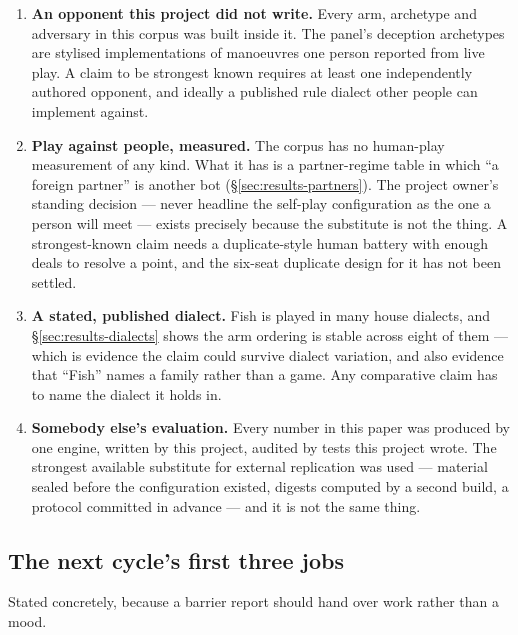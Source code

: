 \begin{enumerate}

\item \textbf{An opponent this project did not write.} Every arm, archetype and adversary in this
  corpus was built inside it. The panel's deception archetypes are stylised implementations of
  manoeuvres one person reported from live play. A claim to be strongest known requires at least one
  independently authored opponent, and ideally a published rule dialect other people can implement
  against.

\item \textbf{Play against people, measured.} The corpus has no human-play measurement of any kind.
  What it has is a partner-regime table in which ``a foreign partner'' is another bot
  (\S\ref{sec:results-partners}). The project owner's standing decision --- never headline the
  self-play configuration as the one a person will meet --- exists precisely because the substitute is
  not the thing. A strongest-known claim needs a duplicate-style human battery with enough deals to
  resolve a point, and the six-seat duplicate design for it has not been settled.

\item \textbf{A stated, published dialect.} Fish is played in many house dialects, and
  \S\ref{sec:results-dialects} shows the arm ordering is stable across eight of them --- which is
  evidence the claim could survive dialect variation, and also evidence that ``Fish'' names a family
  rather than a game. Any comparative claim has to name the dialect it holds in.

\item \textbf{Somebody else's evaluation.} Every number in this paper was produced by one engine,
  written by this project, audited by tests this project wrote. The strongest available substitute for
  external replication was used --- material sealed before the configuration existed, digests computed
  by a second build, a protocol committed in advance --- and it is not the same thing.

\end{enumerate}

\subsection{The next cycle's first three jobs}
\label{sec:towardone-next}

Stated concretely, because a barrier report should hand over work rather than a mood.

